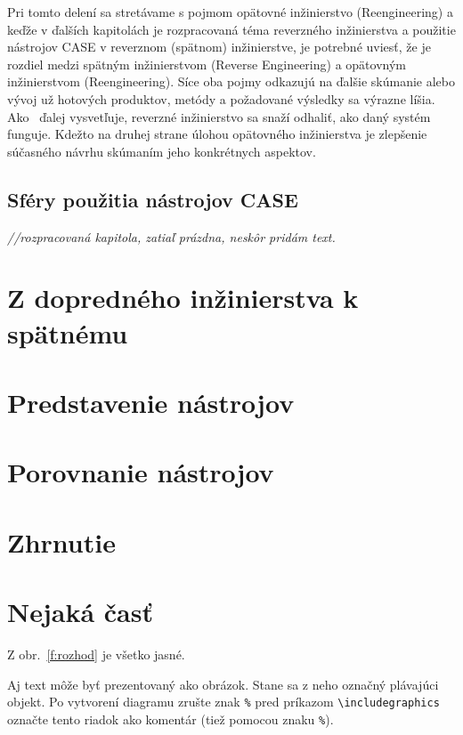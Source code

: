 \documentclass[10pt,twoside,slovak,a4paper]{article}
\begin{document}
Pri tomto delení sa stretávame s pojmom opätovné inžinierstvo (Reengineering) a keďže v ďalších kapitolách je rozpracovaná téma reverzného inžinierstva a použitie nástrojov CASE v reverznom (spätnom) inžinierstve, je potrebné uviesť, že je rozdiel medzi spätným inžinierstvom (Reverse Engineering) a opätovným inžinierstvom (Reengineering). Síce oba pojmy odkazujú na ďalšie skúmanie alebo vývoj už hotových produktov, metódy a požadované výsledky sa výrazne líšia.  Ako~\cite{reengineering} ďalej vysvetľuje, reverzné inžinierstvo sa snaží odhaliť, ako daný systém funguje. Kdežto na druhej strane úlohou opätovného inžinierstva je zlepšenie súčasného návrhu skúmaním jeho konkrétnych aspektov. 

\subsection{Sféry použitia nástrojov CASE}\label{sféry}
\emph{//rozpracovaná kapitola, zatiaľ prázdna, neskôr pridám text.}

\section{Z dopredného inžinierstva k spätnému}\label{forward vs reverse}

\section{Predstavenie nástrojov}\label{predstavenie}

\section{Porovnanie nástrojov}\label{porovnanie}

\section{Zhrnutie} \label{zhrnutie} 

\section{Nejaká časť} \label{nejaka}

Z obr.~\ref{f:rozhod} je všetko jasné. 

\begin{figure*}[tbh]
\centering
Aj text môže byť prezentovaný ako obrázok. Stane sa z neho označný plávajúci objekt. Po vytvorení diagramu zrušte znak \texttt{\%} pred príkazom \verb|\includegraphics| označte tento riadok ako komentár (tiež pomocou znaku \texttt{\%}).
\caption{Rozhodujúci argument.}
\label{f:rozhod}
\end{figure*}
\end{document}
